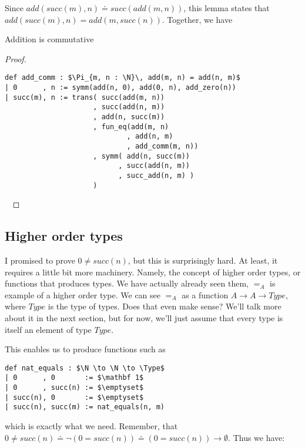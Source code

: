 \documentclass[a4paper, 12pt]{article}
\newcommand{\N}{\mathbb{N}}
\newcommand{\Type}{\mathit{Type}}
\theoremstyle{changedot}
\theoremstyle{changedotbreak}
\theoremstyle{nonumberplain}
\newtheorem{proof}{Proof}
\begin{document}
Since $add(succ(m), n) \doteq succ(add(m, n))$, this lemma states that $add(succ(m), n) = add(m, succ(n))$. Together, we have
\begin{theorem}
  Addition is commutative
\end{theorem}
\begin{proof}~
\begin{lstlisting}[mathescape=true]
def add_comm : $\Pi_{m, n : \N}\, add(m, n) = add(n, m)$
| 0      , n := symm(add(n, 0), add(0, n), add_zero(n))
| succ(m), n := trans( succ(add(m, n))
                     , succ(add(n, m))
                     , add(n, succ(m))
                     , fun_eq(add(m, n)
                             , add(n, m)
                             , add_comm(m, n))
                     , symm( add(n, succ(m))
                           , succ(add(n, m))
                           , succ_add(n, m) )
                     )
\end{lstlisting}~
\end{proof}

\subsection{Higher order types}
I promised to prove $0 \neq succ(n)$, but this is surprisingly hard. At least, it requires a little bit more machinery. Namely, the concept of higher order types, or functions that produces types. We have actually already seen them, $=_{A}$ is example of a higher order type. We can see $=_{A}$ as a function $A \to A \to \mathit{Type}$, where $\mathit{Type}$ is the type of types. Does that even make sense? We'll talk more about it in the next section, but for now, we'll just assume that every type is itself an element of type $\mathit{Type}$.

This enables us to produce functions such as

\begin{lstlisting}[mathescape=true]
def nat_equals : $\N \to \N \to \Type$
| 0      , 0       := $\mathbf 1$
| 0      , succ(n) := $\emptyset$
| succ(n), 0       := $\emptyset$
| succ(n), succ(m) := nat_equals(n, m)
\end{lstlisting}

which is exactly what we need. Remember, that $0 \neq succ(n) \doteq \neg(0 = succ(n)) \doteq (0 = succ(n)) \to \emptyset$. Thus we have:
\end{document}
